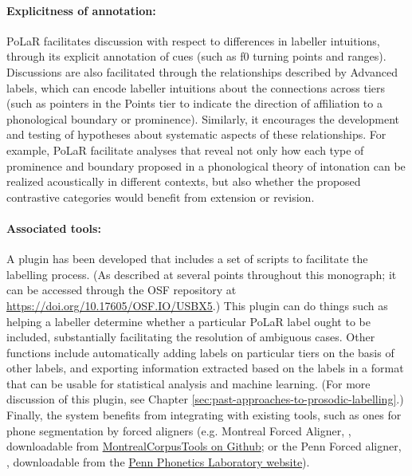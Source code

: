 \paragraph{Explicitness of annotation:}
PoLaR facilitates discussion with respect to differences in labeller intuitions, through its explicit annotation of cues (such as f0 turning points and ranges). Discussions are also facilitated through the relationships described by Advanced labels, which can encode labeller intuitions about the connections across tiers (such as pointers in the Points tier to indicate the direction of affiliation to a phonological boundary or prominence). Similarly, it encourages the development and testing of hypotheses about systematic aspects of these relationships. For example, PoLaR facilitate analyses that reveal not only how each type of prominence and boundary proposed in a phonological theory of intonation can be realized acoustically in different contexts, but also whether the proposed contrastive categories would benefit from extension or revision.

\paragraph{Associated tools:}
A plugin has been developed that includes a set of scripts to facilitate the labelling process. (As described at several points throughout this monograph; it can be accessed through the OSF repository at \url{https://doi.org/10.17605/OSF.IO/USBX5}.) This plugin can do things such as helping a labeller determine whether a particular PoLaR label ought to be included, substantially facilitating the resolution of ambiguous cases. Other functions include automatically adding labels on particular tiers on the basis of other labels, and exporting information extracted based on the labels in a format that can be usable for statistical analysis and machine learning.  (For more discussion of this plugin, see Chapter \ref{sec:past-approaches-to-prosodic-labelling}.) Finally, the system benefits from integrating with existing tools, such as ones for phone segmentation by forced aligners (e.g. Montreal Forced Aligner, \citealt{mcauliffe-19}, downloadable from \href{https://github.com/MontrealCorpusTools/Montreal-Forced-Aligner}{MontrealCorpusTools on Github}; or the Penn Forced aligner, \citealt{yuanliberman08}, downloadable from the \href{https://web.sas.upenn.edu/phonetics-lab/facilities/}{Penn Phonetics Laboratory website}).

